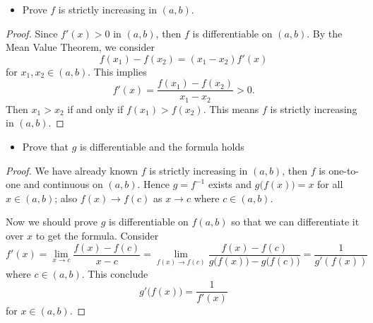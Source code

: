 \begin{Exercise}
	\begin{itemize}
		\item Prove $f$ is strictly increasing in $(a,b)$.
	\end{itemize}
	\begin{proof}
		Since $f'(x) > 0$ in $(a,b)$, then $f$ is differentiable on $(a,b)$. 
		By the Mean Value Theorem, we consider
		$$
		f(x_1) - f(x_2) = (x_1 - x_2) f'(x)
		$$
		for $x_1,x_2\in (a,b)$. This implies
		$$
		f'(x) = \frac{f(x_1)-f(x_2)}{x_1-x_2} > 0.
		$$
		Then $x_1 > x_2$ if and only if $f(x_1) > f(x_2)$. This means $f$ is strictly increasing in $(a,b)$.
	\end{proof}
	\begin{itemize}
		\item Prove that $g$ is differentiable and the formula holds
	\end{itemize}
	\begin{proof}
		We have already known $f$ is strictly increasing in $(a,b)$, then $f$ is one-to-one and continuous on $(a,b)$. 
		Hence $g = f^{-1}$ exists and $g\big( f(x) \big) = x$ for all $x\in(a,b)$; also $f(x)\to f(c)$ as $x\to c$ where $c\in(a,b)$.
		
		Now we should prove $g$ is differentiable on $f(a,b)$ so that we can differentiate it over $x$ to get the formula.
		Consider
		$$
		f'(x) = \lim_{x\to c}\frac{f(x)-f(c)}{x-c}
		= \lim_{f(x)\to f(c)}\frac{f(x)-f(c)}{g\big( f(x) \big) - g\big( f(c) \big)}
		= \frac{1}{g'(f(x))}
		$$
		where $c\in(a,b)$. This conclude
		$$
		g'\big( f(x) \big) = \frac{1}{f'(x)}
		$$
		for $x\in(a,b)$.
	\end{proof}
\end{Exercise}